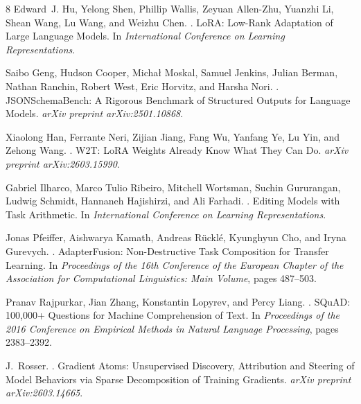 
\begin{thebibliography}{8}
Edward~J. Hu, Yelong Shen, Phillip Wallis, Zeyuan Allen-Zhu, Yuanzhi Li, Shean Wang, Lu Wang, and Weizhu Chen.
.
\newblock LoRA: Low-Rank Adaptation of Large Language Models.
\newblock In \emph{International Conference on Learning Representations}.

Saibo Geng, Hudson Cooper, Micha{\l} Moskal, Samuel Jenkins, Julian Berman, Nathan Ranchin, Robert West, Eric Horvitz, and Harsha Nori.
.
\newblock JSONSchemaBench: A Rigorous Benchmark of Structured Outputs for Language Models.
\newblock \emph{arXiv preprint arXiv:2501.10868}.

Xiaolong Han, Ferrante Neri, Zijian Jiang, Fang Wu, Yanfang Ye, Lu Yin, and Zehong Wang.
.
\newblock W2T: LoRA Weights Already Know What They Can Do.
\newblock \emph{arXiv preprint arXiv:2603.15990}.

Gabriel Ilharco, Marco Tulio Ribeiro, Mitchell Wortsman, Suchin Gururangan, Ludwig Schmidt, Hannaneh Hajishirzi, and Ali Farhadi.
.
\newblock Editing Models with Task Arithmetic.
\newblock In \emph{International Conference on Learning Representations}.

Jonas Pfeiffer, Aishwarya Kamath, Andreas R{\"u}ckl{\'e}, Kyunghyun Cho, and Iryna Gurevych.
.
\newblock AdapterFusion: Non-Destructive Task Composition for Transfer Learning.
\newblock In \emph{Proceedings of the 16th Conference of the European Chapter of the Association for Computational Linguistics: Main Volume}, pages 487--503.

Pranav Rajpurkar, Jian Zhang, Konstantin Lopyrev, and Percy Liang.
.
\newblock SQuAD: 100,000+ Questions for Machine Comprehension of Text.
\newblock In \emph{Proceedings of the 2016 Conference on Empirical Methods in Natural Language Processing}, pages 2383--2392.

J.~Rosser.
.
\newblock Gradient Atoms: Unsupervised Discovery, Attribution and Steering of Model Behaviors via Sparse Decomposition of Training Gradients.
\newblock \emph{arXiv preprint arXiv:2603.14665}.


\end{thebibliography}
